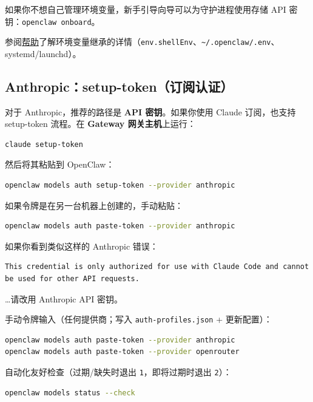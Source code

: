 如果你不想自己管理环境变量，新手引导向导可以为守护进程使用存储 API 密钥：\texttt{openclaw onboard}。

参阅\href{/help}{帮助}了解环境变量继承的详情（\texttt{env.shellEnv}、\texttt{\textasciitilde{}/.openclaw/.env}、systemd/launchd）。

\subsection{Anthropic：setup-token（订阅认证）}


对于 Anthropic，推荐的路径是 \textbf{API 密钥}。如果你使用 Claude 订阅，也支持 setup-token 流程。在 \textbf{Gateway 网关主机}上运行：

\begin{lstlisting}[language=bash]
claude setup-token
\end{lstlisting}


然后将其粘贴到 OpenClaw：

\begin{lstlisting}[language=bash]
openclaw models auth setup-token --provider anthropic
\end{lstlisting}


如果令牌是在另一台机器上创建的，手动粘贴：

\begin{lstlisting}[language=bash]
openclaw models auth paste-token --provider anthropic
\end{lstlisting}


如果你看到类似这样的 Anthropic 错误：

\begin{lstlisting}
This credential is only authorized for use with Claude Code and cannot be used for other API requests.
\end{lstlisting}


…请改用 Anthropic API 密钥。

手动令牌输入（任何提供商；写入 \texttt{auth-profiles.json} + 更新配置）：

\begin{lstlisting}[language=bash]
openclaw models auth paste-token --provider anthropic
openclaw models auth paste-token --provider openrouter
\end{lstlisting}


自动化友好检查（过期/缺失时退出 \texttt{1}，即将过期时退出 \texttt{2}）：

\begin{lstlisting}[language=bash]
openclaw models status --check
\end{lstlisting}


